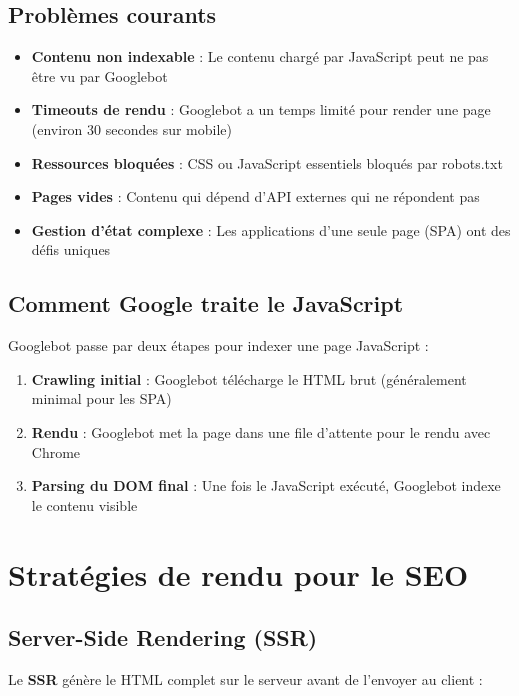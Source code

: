 \documentclass[12pt,a4paper,twoside]{report}
\newcommand{\keyword}[1]{\textbf{\textcolor{googleblue}{#1}}}
\newcommand{\important}[1]{\textbf{\textcolor{googlered}{#1}}}
\begin{document}
\subsection{Problèmes courants}

\begin{itemize}
    \item \important{Contenu non indexable} : Le contenu chargé par JavaScript peut ne pas être vu par Googlebot
    \item \important{Timeouts de rendu} : Googlebot a un temps limité pour render une page (environ 30 secondes sur mobile)
    \item \important{Ressources bloquées} : CSS ou JavaScript essentiels bloqués par robots.txt
    \item \important{Pages vides} : Contenu qui dépend d'API externes qui ne répondent pas
    \item \important{Gestion d'état complexe} : Les applications d'une seule page (SPA) ont des défis uniques
\end{itemize}

\subsection{Comment Google traite le JavaScript}

Googlebot passe par deux étapes pour indexer une page JavaScript :

\begin{enumerate}
    \item \textbf{Crawling initial} : Googlebot télécharge le HTML brut (généralement minimal pour les SPA)
    \item \textbf{Rendu} : Googlebot met la page dans une file d'attente pour le rendu avec Chrome
    \item \textbf{Parsing du DOM final} : Une fois le JavaScript exécuté, Googlebot indexe le contenu visible
\end{enumerate}

\section{Stratégies de rendu pour le SEO}

\subsection{Server-Side Rendering (SSR)}

Le \keyword{SSR} génère le HTML complet sur le serveur avant de l'envoyer au client :
\end{document}
